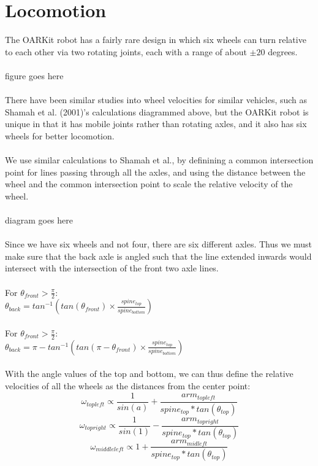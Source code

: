 \documentclass[]{article}
\begin{document}
\section{Locomotion}
The OARKit robot has a fairly rare design in which six wheels can turn relative to each other via two rotating joints, each with a range of about $\pm20$ degrees.
\\
\\
figure goes here
\\
\\
There have been similar studies into wheel velocities for similar vehicles, such as Shamah et al. (2001)'s calculations diagrammed above, but the OARKit robot is unique in that it has mobile joints rather than rotating axles, and it also has six wheels for better locomotion.
\\
\\
We use similar calculations to Shamah et al., by definining a common intersection point for lines passing through all the axles, and using the distance between the wheel and the common intersection point to scale the relative velocity of the wheel.
\\
\\
diagram goes here
\\
\\
Since we have six wheels and not four, there are six different axles. Thus we must make sure that the back axle is angled such that the line extended inwards would intersect with the intersection of the front two axle lines.
\\
\\
For $\theta_{front} > \frac{\pi}{2}$:
\\
$\theta_{back} = tan^{-1}(tan(\theta_{front}) \times \frac{spine_{top}}{spine_{bottom}})$
\\
\\
For $\theta_{front} > \frac{\pi}{2}$:
\\
$\theta_{back} = \pi - tan^{-1}(tan(\pi - \theta_{front}) \times \frac{spine_{top}}{spine_{bottom}})$
\\
\\
With the angle values of the top and bottom, we can thus define the relative velocities of all the wheels as the distances from the center point:
\\
\[ \omega_{topleft} \propto \frac{1}{sin(a)} + \frac{arm_{topleft}}{spine_{top} * tan(\theta_{top})} \]
\[ \omega_{topright} \propto \frac{1}{sin(1)} - \frac{arm_{topright}}{spine_{top} * tan(\theta_{top})} \]
\[ \omega_{middleleft} \propto 1 + \frac{arm_{midleft}}{spine_{top} * tan(\theta_{top})} \]
\end{document}
